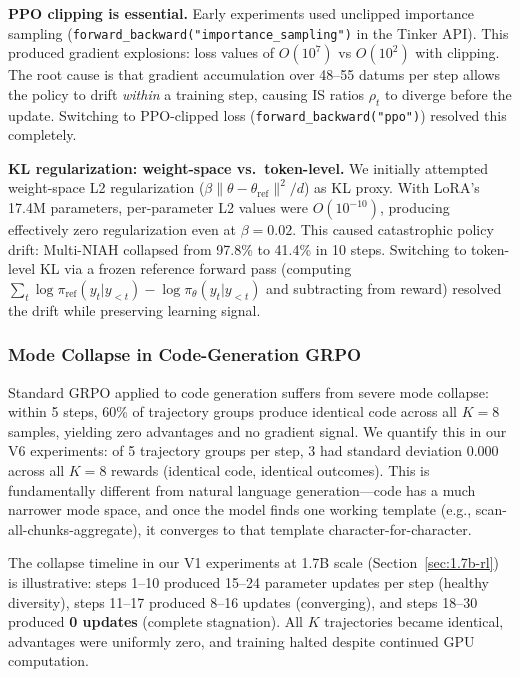 \documentclass{article}
\begin{document}
\textbf{PPO clipping is essential.} Early experiments used unclipped importance sampling (\texttt{forward\_backward("importance\_sampling")} in the Tinker API). This produced gradient explosions: loss values of $O(10^7)$ vs $O(10^2)$ with clipping. The root cause is that gradient accumulation over 48--55 datums per step allows the policy to drift \emph{within} a training step, causing IS ratios $\rho_t$ to diverge before the update. Switching to PPO-clipped loss (\texttt{forward\_backward("ppo")}) resolved this completely.

\textbf{KL regularization: weight-space vs.\ token-level.} We initially attempted weight-space L2 regularization ($\beta \|\theta - \theta_{\text{ref}}\|^2 / d$) as KL proxy. With LoRA's 17.4M parameters, per-parameter L2 values were $O(10^{-10})$, producing effectively zero regularization even at $\beta{=}0.02$. This caused catastrophic policy drift: Multi-NIAH collapsed from 97.8\% to 41.4\% in 10 steps. Switching to token-level KL via a frozen reference forward pass (computing $\sum_t \log \pi_{\text{ref}}(y_t|y_{<t}) - \log \pi_\theta(y_t|y_{<t})$ and subtracting from reward) resolved the drift while preserving learning signal.

\subsubsection{Mode Collapse in Code-Generation GRPO}

Standard GRPO applied to code generation suffers from severe mode collapse: within 5 steps, 60\% of trajectory groups produce identical code across all $K{=}8$ samples, yielding zero advantages and no gradient signal. We quantify this in our V6 experiments: of 5 trajectory groups per step, 3 had standard deviation 0.000 across all $K{=}8$ rewards (identical code, identical outcomes). This is fundamentally different from natural language generation---code has a much narrower mode space, and once the model finds one working template (e.g., scan-all-chunks-aggregate), it converges to that template character-for-character.

The collapse timeline in our V1 experiments at 1.7B scale (Section~\ref{sec:1.7b-rl}) is illustrative: steps 1--10 produced 15--24 parameter updates per step (healthy diversity), steps 11--17 produced 8--16 updates (converging), and steps 18--30 produced \textbf{0 updates} (complete stagnation). All $K$ trajectories became identical, advantages were uniformly zero, and training halted despite continued GPU computation.
\end{document}
